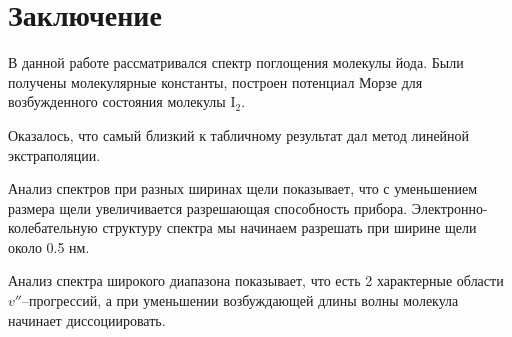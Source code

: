 \newpage
\section{Заключение}
В данной работе рассматривался спектр поглощения молекулы йода. Были получены молекулярные константы, построен потенциал Морзе для возбужденного состояния молекулы $\text{I}_2$.

Оказалось, что самый близкий к табличному результат дал метод линейной экстраполяции. 

Анализ спектров при разных ширинах щели показывает, что с уменьшением размера щели увеличивается разрешающая способность прибора. Электронно-колебательную структуру спектра мы начинаем разрешать при ширине щели около 0.5 нм.

Анализ спектра широкого диапазона показывает, что есть 2 характерные области $v''$--прогрессий, а при уменьшении возбуждающей длины волны молекула начинает диссоциировать.